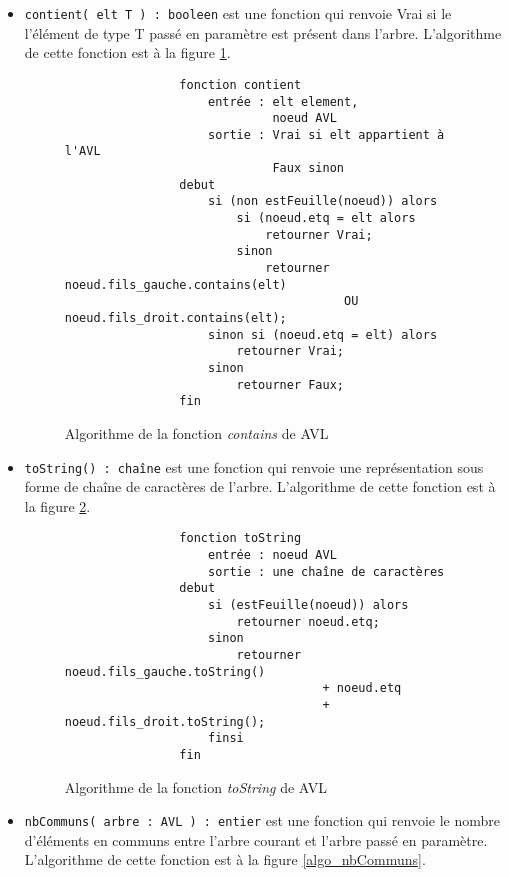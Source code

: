 \documentclass[a4paper]{article}
\begin{document}
		\begin{itemize}
			\item \verb|contient( elt T ) : booleen| est une fonction qui renvoie Vrai si le 
			l'élément de type T passé en paramètre est présent dans l'arbre. L'algorithme de
			cette fonction est à la figure \ref{algo_contains}.
			\begin{figure}
	    	    \begin{verbatim}
	    	    fonction contient
	    	        entrée : elt element,
	    	                 noeud AVL
	    	        sortie : Vrai si elt appartient à l'AVL
	    	                 Faux sinon
	    	    debut
	    	        si (non estFeuille(noeud)) alors
	    	            si (noeud.etq = elt alors
	    	                retourner Vrai;
	    	            sinon
	    	                retourner noeud.fils_gauche.contains(elt) 
	    	                           OU noeud.fils_droit.contains(elt);
	    	        sinon si (noeud.etq = elt) alors
	    	            retourner Vrai;
	    	        sinon
	    	            retourner Faux;
	    	    fin
	    	    \end{verbatim}
	    	    \caption{Algorithme de la fonction \textit{contains} de AVL \label{algo_contains} }
	    	\end{figure}
			\item \verb|toString() : chaîne| est une fonction qui renvoie une représentation 
			sous forme de chaîne de caractères de l'arbre. L'algorithme de cette fonction est 
			à la figure \ref{algo_toString_avl}.
			
			\begin{figure}
	    	    \begin{verbatim}
	    	    fonction toString
	    	        entrée : noeud AVL
	    	        sortie : une chaîne de caractères
	    	    debut
	    	        si (estFeuille(noeud)) alors
	    	            retourner noeud.etq;
	    	        sinon
	    	            retourner noeud.fils_gauche.toString() 
	    	                        + noeud.etq 
	    	                        + noeud.fils_droit.toString();
	    	        finsi
	    	    fin
	    	    \end{verbatim}
	    	    \caption{Algorithme de la fonction \textit{toString} de AVL \label{algo_toString_avl} }
	    	\end{figure}
	    	
			\item \verb|nbCommuns( arbre : AVL ) : entier| est une fonction qui renvoie
			le nombre d'éléments en communs entre l'arbre courant et l'arbre passé en 
			paramètre. L'algorithme de cette fonction est à la figure \ref{algo_nbCommuns}.
			

\end{itemize}
\end{document}
